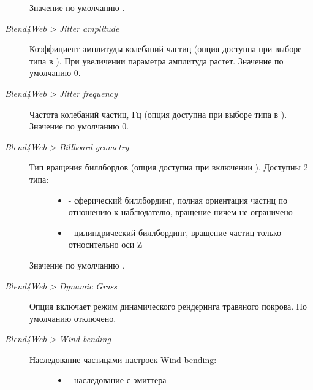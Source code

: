 \documentclass[a4paper,12pt,oneside]{sphinxmanual}
\begin{document}
\begin{description}
\begin{description}
\begin{itemize}
\end{itemize}

\end{description}

Значение по умолчанию .

\item[{\emph{Blend4Web \textgreater{} Jitter amplitude}}] \leavevmode
Коэффициент амплитуды колебаний частиц (опция доступна при выборе типа  в  ). При увеличении параметра амплитуда растет. Значение по умолчанию 0.

\item[{\emph{Blend4Web \textgreater{} Jitter frequency}}] \leavevmode
Частота колебаний частиц, Гц (опция доступна при выборе типа  в  ). Значение по умолчанию 0.

\item[{\emph{Blend4Web \textgreater{} Billboard geometry}}] \leavevmode\begin{description}
\item[{Тип вращения биллбордов (опция доступна при включении ). Доступны 2 типа:}] \leavevmode\begin{itemize}
\item {} 
 - сферический биллбординг, полная ориентация частиц по отношению к наблюдателю, вращение ничем не ограничено

\item {} 
 - цилиндрический биллбординг, вращение частиц только относительно оси Z

\end{itemize}

\end{description}

Значение по умолчанию .

\item[{\emph{Blend4Web \textgreater{} Dynamic Grass}}] \leavevmode
Опция включает режим динамического рендеринга травяного покрова. По умолчанию отключено.

\item[{\emph{Blend4Web \textgreater{} Wind bending}}] \leavevmode\begin{description}
\item[{Наследование частицами настроек Wind bending:}] \leavevmode\begin{itemize}
\item {} 
 - наследование с эмиттера


\end{itemize}
\end{description}
\end{description}
\end{document}
